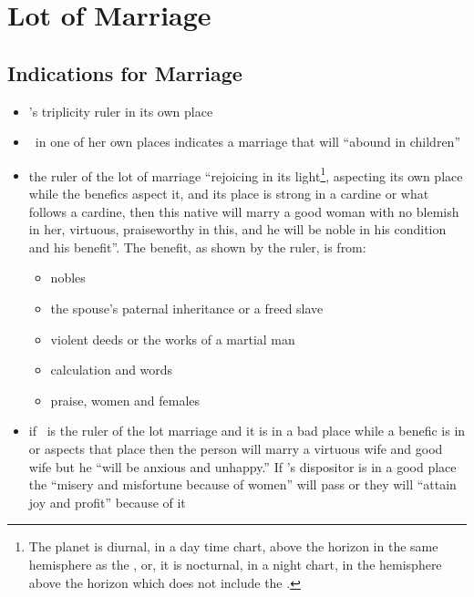 \section{Lot of Marriage}
\subsection{Indications for Marriage}
\begin{itemize}
\item \Venus's triplicity ruler in its own place
\item \Venus\, in one of her own places indicates a marriage that will ``abound in children''

\item the ruler of the lot of marriage ``rejoicing in its light\footnote{The planet is diurnal, in a day time chart, above the horizon in the same hemisphere as the \Sun, or, it is nocturnal, in a night chart, in the hemisphere above the horizon which does not include the \Sun.}, aspecting its own place while the benefics aspect it, and its place is strong in a cardine or what follows a cardine, then this native will marry a good woman with no blemish in her, virtuous, praiseworthy in this, and he will be noble in his condition and his benefit''. The benefit, as shown by the ruler, is from:
	\begin{itemize}
		\item[\Jupiter] nobles
		\item[\Saturn] the spouse's paternal inheritance or a freed slave
		\item[\Mars] violent deeds or the works of a martial man
		\item[\Mercury] calculation and words
		\item[\Venus] praise, women and females
	\end{itemize}

\item if \Mercury\, is the ruler of the lot marriage and it is in a bad place while a benefic is in or aspects that place then the person will marry a virtuous wife and good wife but he ``will be anxious and unhappy.'' If \Mercury's dispositor is in a good place the ``misery and misfortune because of women'' will pass or they will ``attain joy and profit'' because of it


\end{itemize}
